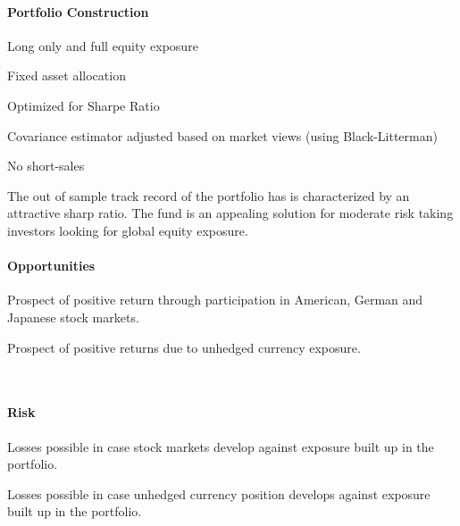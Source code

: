 \documentclass[11pt, parskip=full, DIV=14]{scrreprt}
\begin{document}
\begin{minipage}{0.5\textwidth}
\paragraph{Portfolio Construction}
\begin{sit}
\item Long only and full equity exposure
\item Fixed asset allocation
\item Optimized for Sharpe Ratio
\item Covariance estimator adjusted based on market views (using Black-Litterman)
\item No short-sales
\end{sit}
\end{minipage}
\begin{minipage}{0.5\textwidth}
\end{minipage}

The out of sample track record of the portfolio has is characterized by an attractive sharp ratio.
The fund is an appealing solution for moderate risk taking investors looking for global equity exposure.

\begin{minipage}[t]{0.49\textwidth}
  \paragraph{Opportunities}
  \begin{sit}
    \item Prospect of positive return through participation in American, German and Japanese stock markets.
    \item Prospect of positive returns due to unhedged currency exposure.
  \end{sit}
\end{minipage}
~~
\begin{minipage}[t]{0.49\textwidth}
  \paragraph{Risk}
  \begin{sit}
    \item Losses possible in case stock markets develop against exposure built up in the portfolio.
    \item Losses possible in case unhedged currency position develops against exposure built up in the portfolio.    
  \end{sit}
\end{minipage}
\end{document}
